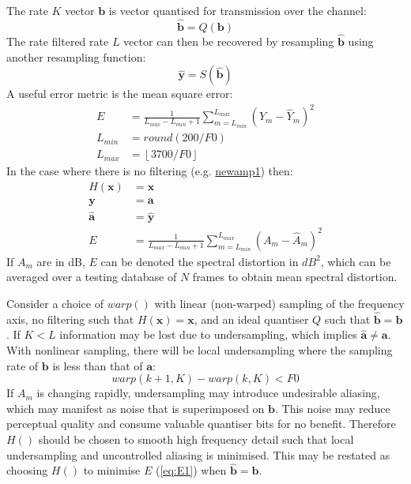 \documentclass{article}
\begin{document}
The rate $K$ vector $\mathbf{b}$ is vector quantised for transmission over the channel:
\begin{equation}
\hat{\mathbf{b}} = Q(\mathbf{b})
\end{equation}
The rate filtered rate $L$ vector can then be recovered by resampling $\mathbf{\hat{b}}$ using another resampling function:
\begin{equation}
\hat{\mathbf{y}} = S(\hat{\mathbf{b}})
\end{equation}
A useful error metric is the mean square error:
\begin{equation} \label{eq:E1}
\begin{split}
E & =\frac{1}{L_{max}-L_{min}+1}\sum_{m=L_{min}}^{L_{max}}(Y_m-\hat{Y}_m)^2 \\
L_{min} & = round(200/F0) \\
L_{max} & =\left \lfloor 3700/F0  \right \rfloor
\end{split}
\end{equation}
In the case where there is no filtering (e.g. \url{newamp1}) then:
\begin{equation}
\begin{split}
H(\mathbf{x}) &= \mathbf{x} \\
\mathbf{y} &= \mathbf{a} \\
\hat{\mathbf{a}} &= \hat{\mathbf{y}} \\
E &=\frac{1}{L_{max}-L_{min}+1}\sum_{m=L_{min}}^{L_{max}}(A_m-\hat{A}_m)^2 
\end{split}
\end{equation}
If $A_m$ are in dB, $E$ can be denoted the spectral distortion in $dB^2$, which can be averaged over a testing database of $N$ frames to obtain mean spectral distortion.

Consider a choice of $warp()$ with linear (non-warped) sampling of the frequency axis, no filtering such that $H(\mathbf{x})=\mathbf{x}$, and an ideal quantiser $Q$ such that $\hat{\mathbf{b}} = \mathbf{b}$. If $K<L$ information may be lost due to undersampling, which implies $\hat{\mathbf{a}} \neq \mathbf{a}$.  
With nonlinear sampling, there will be local undersampling where the sampling rate of $\mathbf{b}$ is less than that of $\mathbf{a}$:
\begin{equation}
warp(k+1,K)-warp(k,K) < F0
\end{equation}
If $A_m$ is changing rapidly, undersampling may introduce undesirable aliasing, which may manifest as noise that is superimposed on $\mathbf{b}$. This noise may reduce perceptual quality and consume valuable quantiser bits for no benefit. Therefore $H()$ should be chosen to smooth high frequency detail such that local undersampling and uncontrolled aliasing is minimised. This may be restated as choosing $H()$ to minimise $E$ (\ref{eq:E1}) when $\hat{\mathbf{b}} = \mathbf{b}$.
\end{document}
